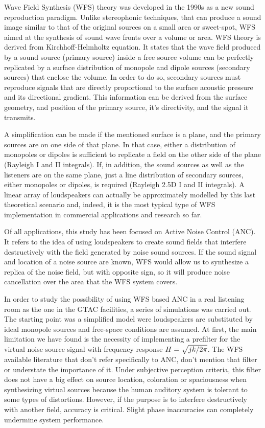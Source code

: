 Wave Field Synthesis (WFS) theory was developed in the 1990s as a new sound reproduction paradigm. Unlike stereophonic techniques, that can produce a sound image similar to that of the original sources on a small area or sweet-spot, WFS aimed at the synthesis of sound wave fronts over a volume or area. WFS theory is derived from Kirchhoff-Helmholtz equation. It states that the wave field produced by a sound source (primary source) inside a free source volume can be perfectly replicated by a surface distribution of monopole and dipole sources (secondary sources) that enclose the volume. In order to do so, secondary sources must reproduce signals that are directly proportional to the surface acoustic pressure and its directional gradient. This information can be derived from the surface geometry, and position of the primary source, it's directivity, and the signal it transmits.

A simplification can be made if the mentioned surface is a plane, and the primary sources are on one side of that plane. In that case, either a distribution of monopoles or dipoles is sufficient to replicate a field on the other side of the plane (Rayleigh I and II integrals). If, in addition, the sound sources as well as the listeners are on the same plane, just a line distribution of secondary sources, either monopoles or dipoles, is required (Rayleigh 2.5D I and II integrals). A linear array of loudspeakers can actually be approximately modelled by this last theoretical scenario and, indeed, it is the most typical type of WFS implementation in commercial applications and research so far.

Of all applications, this study has been focused on Active Noise Control (ANC). It refers to the idea of using loudspeakers to create sound fields that interfere destructively with the field generated by noise sound sources. If the sound signal and location of a noise source are known, WFS would allow us to synthesize a replica of the noise field, but with opposite sign, so it will produce noise cancellation over the area that the WFS system covers.

In order to study the possibility of using WFS based ANC in a real listening room as the one in the GTAC facilities, a series of simulations was carried out. The starting point was a simplified model were loudspeakers are substituted by ideal monopole sources and free-space conditions are assumed. At first, the main limitation we have found is the necessity of implementing a prefilter for the virtual noise source signal with frequency response $\freqFilter[frequency] = \sqrt{jk/2\pi}$. The WFS available literature that don't refer specifically to ANC, don't mention that filter or understate the importance of it. Under subjective perception criteria, this filter does not have a big effect on source location, coloration or spaciousness when synthesizing virtual sources because the human auditory system is tolerant to some types of distortions. However, if the purpose is to interfere destructively with another field, accuracy is critical. Slight phase inaccuracies can completely undermine system performance.

